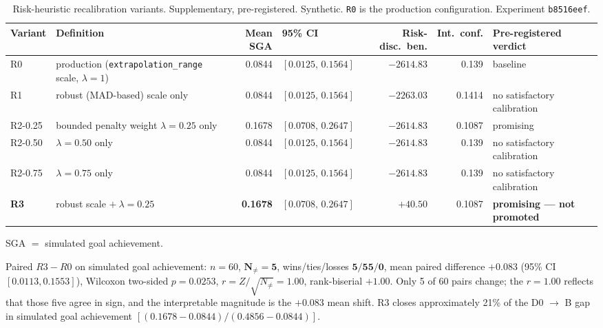 \documentclass[conference]{IEEEtran}
\newcommand{\code}[1]{\texttt{#1}}
\newcommand{\Nnz}{N_{\neq}}                 %
\newcommand{\rzn}{r=Z/\sqrt{\Nnz}}
\newcommand{\expid}[1]{\texttt{#1}}
\begin{document}
\begin{table}[!t]
\caption{Risk-heuristic recalibration variants. Supplementary, pre-registered.
Synthetic. \expid{R0} is the production configuration. Experiment
\expid{b8516eef}.}
\label{tab:recal}
\centering
\renewcommand{\arraystretch}{1.25}
\begin{tabular}{@{}llrlrrl@{}}
\toprule
Variant & Definition & Mean SGA & 95\% CI & Risk-disc.\ ben. & Int.\ conf. & Pre-registered verdict\\
\midrule
R0        & production (\code{extrapolation\_range} scale, $\lambda=1$) & 0.0844 & $[0.0125,\,0.1564]$ & $-2614.83$ & 0.139  & baseline\\
R1        & robust (MAD-based) scale only                              & 0.0844 & $[0.0125,\,0.1564]$ & $-2263.03$ & 0.1414 & no satisfactory calibration\\
R2-0.25   & bounded penalty weight $\lambda=0.25$ only                  & 0.1678 & $[0.0708,\,0.2647]$ & $-2614.83$ & 0.1087 & promising\\
R2-0.50   & $\lambda=0.50$ only                                        & 0.0844 & $[0.0125,\,0.1564]$ & $-2614.83$ & 0.139  & no satisfactory calibration\\
R2-0.75   & $\lambda=0.75$ only                                        & 0.0844 & $[0.0125,\,0.1564]$ & $-2614.83$ & 0.139  & no satisfactory calibration\\
\textbf{R3} & robust scale $+\ \lambda=0.25$                          & \textbf{0.1678} & $[0.0708,\,0.2647]$ & $\mathbf{+40.50}$ & 0.1087 & \textbf{promising --- not promoted}\\
\bottomrule
\end{tabular}

\vspace{2pt}
\footnotesize SGA $=$ simulated goal achievement.
\end{table}

Paired \textbf{$R3 - R0$} on simulated goal achievement: $n = 60$,
$\mathbf{\Nnz = 5}$, wins/ties/losses $\mathbf{5/55/0}$, mean paired difference
$\mathbf{+0.083}$ (95\% CI $[0.0113,0.1553]$), Wilcoxon two-sided
$p = \mathbf{0.0253}$, $\rzn = 1.00$, rank-biserial $+1.00$. Only 5 of 60 pairs
change; the $r = 1.00$ reflects that those five agree in sign, and the
interpretable magnitude is the $+0.083$ mean shift. R3 closes approximately
21\% of the D0 $\rightarrow$ B gap in simulated goal achievement
$[(0.1678 - 0.0844)/(0.4856 - 0.0844)]$.
\end{document}
